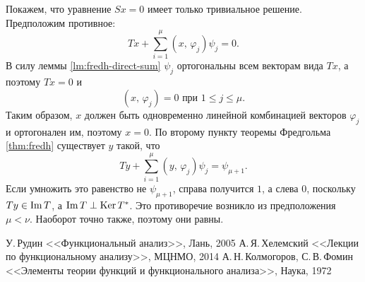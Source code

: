 \documentclass{notes}
\DeclareMathOperator{\Ker}{Ker}
\begin{document}
	Покажем, что уравнение $Sx = 0$ имеет только тривиальное решение. Предположим противное:
	\[
		Tx + \sum\limits_{i = 1}^{\mu} (x, \, \varphi_j) \psi_j = 0.
	\] 
	В силу леммы \ref{lm:fredh-direct-sum} $\psi_j$ ортогональны всем векторам вида $Tx$, а поэтому $Tx = 0$ и 
	\[
		(x, \, \varphi_j) = 0 \text{ при } 1 \leqslant j \leqslant \mu.
	\]
	Таким образом, $x$ должен быть одновременно линейной комбинацией векторов $\varphi_j$ и ортогонален им, поэтому $x = 0$. По второму пункту теоремы Фредгольма \ref{thm:fredh} существует $y$ такой, что
	\[
		Ty + \sum\limits_{i = 1}^{\mu} (y,\, \varphi_j) \psi_j = \psi_{\mu + 1}.
	\]
	Если умножить это равенство не $\psi_{\mu + 1}$, справа получится $1$, а слева $0$, поскольку $Ty \in \operatorname{Im} T$, а $\im T \perp \Ker T^*$. Это противоречие возникло из предположения $\mu < \nu$. Наоборот точно также, поэтому они равны.








\begin{thebibliography}{}

 У.$\,$Рудин <<Функциональный анализ>>, Лань, 2005
 А.$\,$Я.$\,$Хелемский <<Лекции по функциональному анализу>>, МЦНМО, 2014
 А.$\,$Н.$\,$Колмогоров,  С.$\,$В.$\,$Фомин <<Элементы теории функций и функционального анализа>>, Наука, 1972


\end{thebibliography}{}
\end{document}
